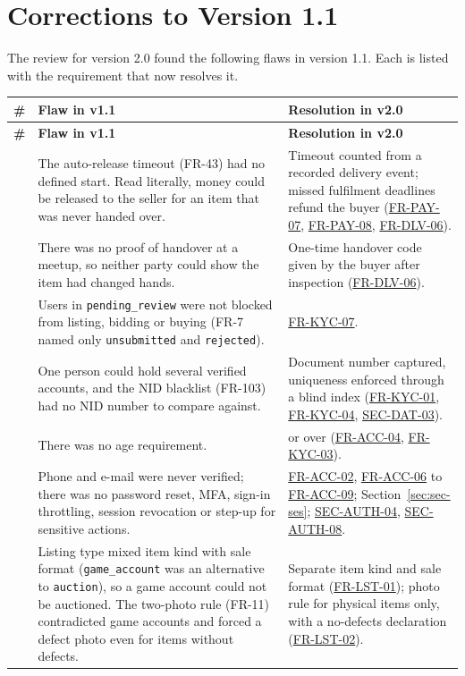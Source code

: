 \documentclass[11pt,a4paper]{report}
\newcommand{\rr}[1]{\hyperlink{#1}{#1}}
\begin{document}
\chapter{Corrections to Version 1.1}
\label{app:changes}
The review for version 2.0 found the following flaws in version 1.1. Each is listed with the requirement that now resolves it.
{\small
\begin{longtable}{@{}>{\raggedleft\arraybackslash}p{0.5cm} >{\raggedright\arraybackslash}p{7.3cm} >{\raggedright\arraybackslash}p{6.8cm}@{}}
\toprule
\textbf{\#} & \textbf{Flaw in v1.1} & \textbf{Resolution in v2.0} \\
\midrule
\endfirsthead
\toprule
\textbf{\#} & \textbf{Flaw in v1.1} & \textbf{Resolution in v2.0} \\
\midrule
\endhead
\bottomrule
\endfoot
1 & The auto-release timeout (FR-43) had no defined start. Read literally, money could be released to the seller for an item that was never handed over. & Timeout counted from a recorded delivery event; missed fulfilment deadlines refund the buyer (\rr{FR-PAY-07}, \rr{FR-PAY-08}, \rr{FR-DLV-06}). \\
2 & There was no proof of handover at a meetup, so neither party could show the item had changed hands. & One-time handover code given by the buyer after inspection (\rr{FR-DLV-06}). \\
3 & Users in \texttt{pending\_review} were not blocked from listing, bidding or buying (FR-7 named only \texttt{unsubmitted} and \texttt{rejected}). & \rr{FR-KYC-07}. \\
4 & One person could hold several verified accounts, and the NID blacklist (FR-103) had no NID number to compare against. & Document number captured, uniqueness enforced through a blind index (\rr{FR-KYC-01}, \rr{FR-KYC-04}, \rr{SEC-DAT-03}). \\
5 & There was no age requirement. & 18 or over (\rr{FR-ACC-04}, \rr{FR-KYC-03}). \\
6 & Phone and e-mail were never verified; there was no password reset, MFA, sign-in throttling, session revocation or step-up for sensitive actions. & \rr{FR-ACC-02}, \rr{FR-ACC-06} to \rr{FR-ACC-09}; Section~\ref{sec:sec-ses}; \rr{SEC-AUTH-04}, \rr{SEC-AUTH-08}. \\
7 & Listing type mixed item kind with sale format (\texttt{game\_account} was an alternative to \texttt{auction}), so a game account could not be auctioned. The two-photo rule (FR-11) contradicted game accounts and forced a defect photo even for items without defects. & Separate item kind and sale format (\rr{FR-LST-01}); photo rule for physical items only, with a no-defects declaration (\rr{FR-LST-02}). \\

\end{longtable}}
\end{document}
